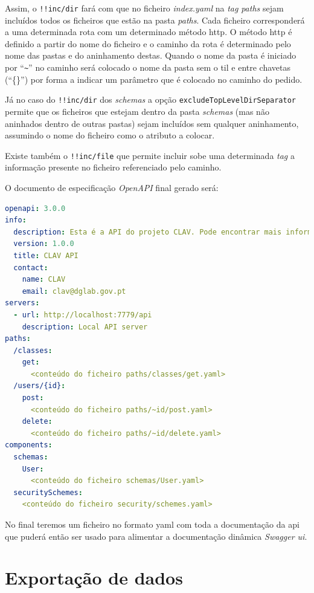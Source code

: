 Assim, o \texttt{!!inc/dir} fará com que no ficheiro \textit{index.yaml} na \textit{tag} \textit{paths} sejam incluídos todos os ficheiros que estão na pasta \textit{paths}. Cada ficheiro corresponderá a uma determinada rota com um determinado método \acrshort{http}. O método \acrshort{http} é definido a partir do nome do ficheiro e o caminho da rota é determinado pelo nome das pastas e do aninhamento destas. Quando o nome da pasta é iniciado por ``\verb|~|'' no caminho será colocado o nome da pasta sem o til e entre chavetas (``\{\}'') por forma a indicar um parâmetro que é colocado no caminho do pedido.

Já no caso do \texttt{!!inc/dir} dos \textit{schemas} a opção \texttt{excludeTopLevelDirSeparator} permite que os ficheiros que estejam dentro da pasta \textit{schemas} (mas não aninhados dentro de outras pastas) sejam incluídos sem qualquer aninhamento, assumindo o nome do ficheiro como o atributo a colocar.

Existe também o \texttt{!!inc/file} que permite incluir sobe uma determinada \textit{tag} a informação presente no ficheiro referenciado pelo caminho.

O documento de especificação \textit{OpenAPI} final gerado será:
\begin{lstlisting}[language=yaml, caption=Documento de especificação \textit{OpenAPI} gerado a partir do ficheiro \textit{index.yaml} com o uso da \textit{package} \texttt{yaml-include}, label=exem:yamlif]
openapi: 3.0.0
info:
  description: Esta é a API do projeto CLAV. Pode encontrar mais informação sobre o CLAV em [http://clav.dglab.gov.pt](http://clav.dglab.gov.pt).
  version: 1.0.0
  title: CLAV API
  contact:
    name: CLAV
    email: clav@dglab.gov.pt
servers:
  - url: http://localhost:7779/api
    description: Local API server
paths:
  /classes:
    get:
      <conteúdo do ficheiro paths/classes/get.yaml>
  /users/{id}:
    post:
      <conteúdo do ficheiro paths/~id/post.yaml>
    delete:
      <conteúdo do ficheiro paths/~id/delete.yaml>
components:
  schemas:
    User:
      <conteúdo do ficheiro schemas/User.yaml>
  securitySchemes:
    <conteúdo do ficheiro security/schemes.yaml>
\end{lstlisting}

No final teremos um ficheiro no formato \acrshort{yaml} com toda a documentação da \acrshort{api} que puderá então ser usado para alimentar a documentação dinâmica \textit{Swagger \acrshort{ui}}.

\section{Exportação de dados}

